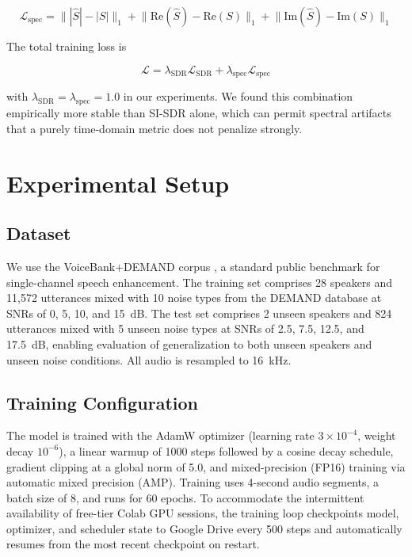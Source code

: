 \documentclass[conference]{IEEEtran}
\begin{document}
\begin{equation}
\mathcal{L}_{\text{spec}} = \big\||\hat{S}| - |S|\big\|_1 +
\big\|\text{Re}(\hat{S}) - \text{Re}(S)\big\|_1 +
\big\|\text{Im}(\hat{S}) - \text{Im}(S)\big\|_1
\end{equation}

The total training loss is

\begin{equation}
\mathcal{L} = \lambda_{\text{SDR}} \mathcal{L}_{\text{SDR}} + \lambda_{\text{spec}}
\mathcal{L}_{\text{spec}}
\end{equation}

with $\lambda_{\text{SDR}} = \lambda_{\text{spec}} = 1.0$ in our experiments. We found this
combination empirically more stable than SI-SDR alone, which can permit spectral artifacts
that a purely time-domain metric does not penalize strongly.

\section{Experimental Setup}

\subsection{Dataset}

We use the VoiceBank+DEMAND corpus \cite{valentini2016investigating}, a standard public
benchmark for single-channel speech enhancement. The training set comprises 28 speakers and
11{,}572 utterances mixed with 10 noise types from the DEMAND database
\cite{thiemann2013diverse} at SNRs of 0, 5, 10, and 15~dB. The test set comprises 2 unseen
speakers and 824 utterances mixed with 5 unseen noise types at SNRs of 2.5, 7.5, 12.5, and
17.5~dB, enabling evaluation of generalization to both unseen speakers and unseen noise
conditions. All audio is resampled to 16~kHz.

\subsection{Training Configuration}

The model is trained with the AdamW optimizer (learning rate $3\times10^{-4}$, weight decay
$10^{-6}$), a linear warmup of 1000 steps followed by a cosine decay schedule, gradient
clipping at a global norm of 5.0, and mixed-precision (FP16) training via automatic mixed
precision (AMP). Training uses 4-second audio segments, a batch size of 8, and runs for 60
epochs. To accommodate the intermittent availability of free-tier Colab GPU sessions, the
training loop checkpoints model, optimizer, and scheduler state to Google Drive every 500
steps and automatically resumes from the most recent checkpoint on restart.
\end{document}
